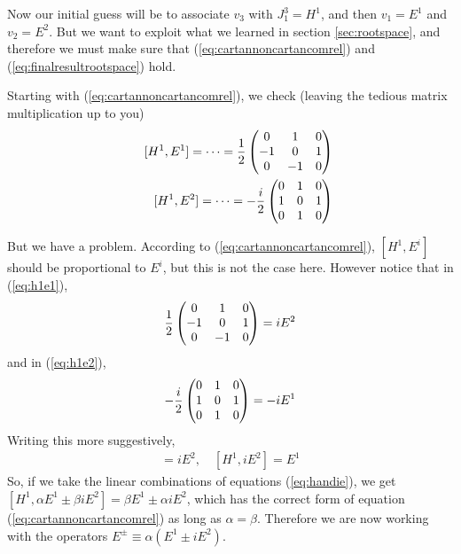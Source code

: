 \documentclass[12pt,epsf]{article}
\def\nolabel{\nonumber }
\def\nolabel{\nonumber }
\begin{document}
Now our initial guess will be to associate $v_3$ with $J^3_1 = H^1$,
and then $v_1 = E^1$ and $v_2 = E^2$.  But we want to exploit what we
learned in section \ref{sec:rootspace}, and therefore we must make sure
that (\ref{eq:cartannoncartancomrel}) and
(\ref{eq:finalresultrootspace}) hold.  

Starting with (\ref{eq:cartannoncartancomrel}), we check (leaving the
tedious matrix multiplication up to you)
\begin{eqnarray}
& &\;[H^1,E^1] = \cdots = {1\over 2}
\begin{pmatrix}
0 & 1 & 0 \\ -1 & 0 & 1 \\ 0 & -1 & 0
\end{pmatrix} \label{eq:h1e1} \\
& &\;[H^1,E^2] = \cdots = -{i\over 2}
\begin{pmatrix}
0 & 1 & 0 \\ 1 & 0 & 1 \\ 0 & 1 & 0
\end{pmatrix} \label{eq:h1e2}
\end{eqnarray}

But we have a problem.	According to (\ref{eq:cartannoncartancomrel}),
$[H^1,E^i]$ should be proportional to $E^i$, but this is not the case
here.  However notice that in (\ref{eq:h1e1}),
\begin{eqnarray}
{1\over 2}\begin{pmatrix}
0 & 1 & 0 \\ -1 & 0 & 1 \\ 0 & -1 & 0
\end{pmatrix} = iE^2\nolabel
\end{eqnarray}
and in (\ref{eq:h1e2}),
\begin{eqnarray}
-{i\over 2}
\begin{pmatrix}
0 & 1 & 0 \\ 1 & 0 & 1 \\ 0 & 1 & 0
\end{pmatrix} = -i E^1\nolabel
\end{eqnarray}
Writing this more suggestively,
\begin{eqnarray}
[H^1,E^1] = iE^2, \quad [H^1,iE^2] = E^1 \label{eq:handie}
\end{eqnarray}
So, if we take the linear combinations of equations (\ref{eq:handie}),
we get $[H^1,\alpha E^1\pm \beta iE^2] = \beta E^1 \pm \alpha i E^2$,
which has the correct form of equation (\ref{eq:cartannoncartancomrel})
as long as $\alpha = \beta$.  Therefore we are now working with the
operators $E^{\pm} \equiv \alpha (E^1 \pm iE^2)$.  
\end{document}
